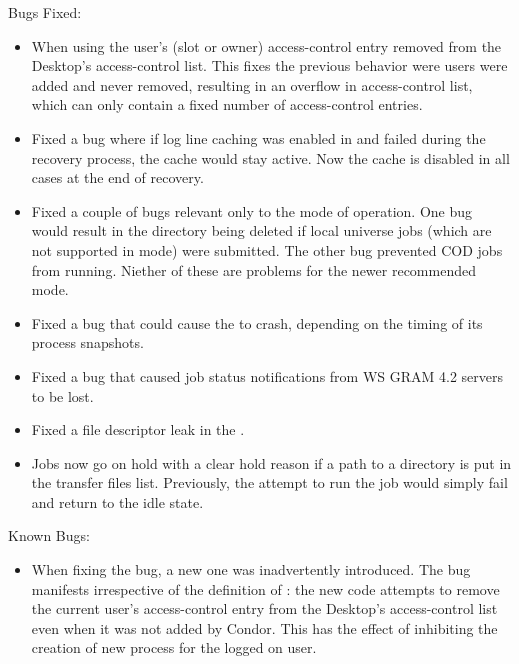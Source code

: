 \noindent Bugs Fixed:

\begin{itemize}

\item When using  the user's (slot or owner)
access-control entry removed from the Desktop's access-control list.  This
fixes the previous behavior were users were added and never removed, 
resulting in an overflow in access-control list, which can only contain 
a fixed number of access-control entries.

\item Fixed a bug where if log line caching was enabled in 
and  failed during the recovery process, the cache would
stay active. Now the cache is disabled in all cases at the end of recovery.

\item Fixed a couple of bugs relevant only to the 
mode of operation. One bug would result in the  directory being
deleted if local universe jobs (which are not supported in
 mode) were submitted. The other bug prevented
COD jobs from running. Niether of these are problems for the newer
recommended  mode.

\item Fixed a bug that could cause the  to crash, depending
on the timing of its process snapshots.

\item Fixed a bug that caused job status notifications from WS GRAM 4.2
servers to be lost.

\item Fixed a file descriptor leak in the .

\item Jobs now go on hold with a clear hold reason if a path to a
directory is put in the transfer files list.  Previously, the attempt
to run the job would simply fail and return to the idle state.

\end{itemize}

\noindent Known Bugs:

\begin{itemize}

\item When fixing the  bug, a new one was
inadvertently introduced.  The bug manifests irrespective of the definition
of : the new code attempts to remove the current 
user's access-control entry from the Desktop's access-control list even when
it was not added by Condor.  This has the effect of inhibiting the creation
of new process for the logged on user.

\end{itemize}

